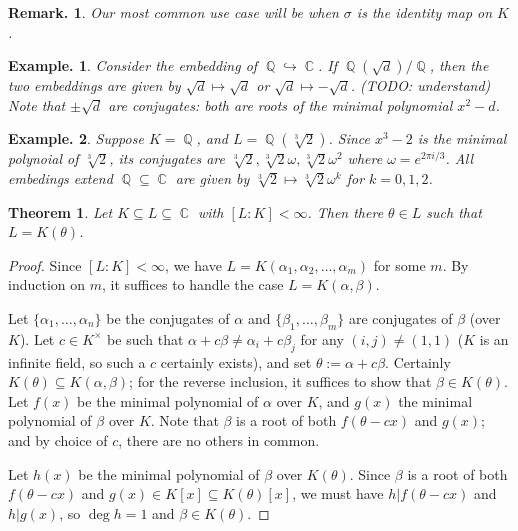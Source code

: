\documentclass[11pt, a4paper]{memoir}
\DeclareMathOperator{\Q}{{\mathbb{Q}}}
\DeclareMathOperator{\C}{{\mathbb{C}}}
\theoremstyle{change}
\newtheorem{theorem}{Theorem}[section]
\theoremstyle{plain}
\theoremstyle{nonumberplain}
\newtheorem{example}{Example.}
\newtheorem{remark}{Remark.}
\newtheorem{proof}{Proof}
\begin{document}
\begin{remark}
    Our most common use case will be when $\sigma$ is the identity map on $K$.
\end{remark}
\begin{example}
    Consider the embedding of $\Q\hookrightarrow\C$.
    If $\Q(\sqrt{d})/\Q$, then the two embeddings are given by $\sqrt{d}\mapsto\sqrt{d}$ or $\sqrt{d}\mapsto-\sqrt{d}$. (TODO: understand)
    Note that $\pm\sqrt{d}$ are conjugates: both are roots of the minimal polynomial $x^2-d$.
\end{example}
\begin{example}
    Suppose $K=\Q$, and $L=\Q(\sqrt[3]{2})$.
    Since $x^3-2$ is the minimal polynoial of $\sqrt[3]{2}$, its conjugates are $\sqrt[3]{2},\sqrt[3]{2}\omega,\sqrt[3]{2}\omega^2$ where $\omega=e^{2\pi i/3}$.
    All embedings extend $\Q\subseteq\C$ are given by $\sqrt[3]{2}\mapsto\sqrt[3]{2}\omega^k$ for $k=0,1,2$.
\end{example}
\begin{theorem}
    Let $K\subseteq L\subseteq\C$ with $[L:K]<\infty$.
    Then there $\theta\in L$ such that $L=K(\theta)$.
\end{theorem}
\begin{proof}
    Since $[L:K]<\infty$, we have $L=K(\alpha_1,\alpha_2,\ldots,\alpha_m)$ for some $m$.
    By induction on $m$, it suffices to handle the case $L=K(\alpha,\beta)$.

    Let $\{\alpha_1,\ldots,\alpha_n\}$ be the conjugates of $\alpha$ and $\{\beta_1,\ldots,\beta_m\}$ are conjugates of $\beta$ (over $K$).
    Let $c\in K^\times$ be such that $\alpha+c\beta\neq\alpha_i+c\beta_j$ for any $(i,j)\neq(1,1)$ ($K$ is an infinite field, so such a $c$ certainly exists), and set $\theta:=\alpha+c\beta$.
    Certainly $K(\theta)\subseteq K(\alpha,\beta)$; for the reverse inclusion, it suffices to show that $\beta\in K(\theta)$.
    Let $f(x)$ be the minimal polynomial of $\alpha$ over $K$, and $g(x)$ the minimal polynomial of $\beta$ over $K$.
    Note that $\beta$ is a root of both $f(\theta-cx)$ and $g(x)$; and by choice of $c$, there are no others in common.

    Let $h(x)$ be the minimal polynomial of $\beta$ over $K(\theta)$.
    Since $\beta$ is a root of both $f(\theta-cx)$ and $g(x)\in K[x]\subseteq K(\theta)[x]$, we must have $h|f(\theta-cx)$ and $h|g(x)$, so $\deg h=1$ and $\beta\in K(\theta)$.
\end{proof}
\end{document}
